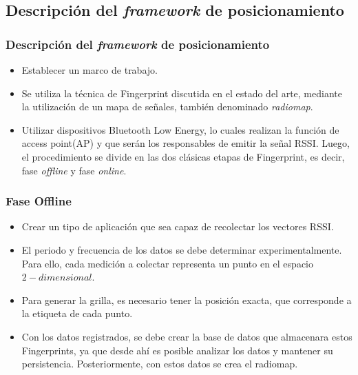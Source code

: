 \documentclass[mathserif]{beamer}
\begin{document}
\subsection{Descripción del \textit{framework} de posicionamiento}
\begin{frame}
\frametitle{Descripción del \textit{framework} de posicionamiento}

\begin{itemize}

\item Establecer un marco de trabajo.

\pause

\item Se utiliza la técnica de Fingerprint discutida en el estado del arte, mediante la utilización de un mapa de señales, también denominado \textit{radiomap}.

\pause

\item Utilizar dispositivos Bluetooth Low Energy, lo cuales realizan la función de access point(AP) y que serán los responsables de emitir la señal RSSI. Luego, el procedimiento se divide en las dos clásicas etapas de Fingerprint, es decir, fase \textit{offline} y fase \textit{online}.
\end{itemize}


\end{frame}



\begin{frame}
\frametitle{Fase Offline}

\begin{itemize}
\item Crear un tipo de aplicación que sea capaz de recolectar los vectores RSSI.

\pause

\item El periodo y frecuencia de los datos se debe determinar experimentalmente. Para ello, cada medición a colectar representa un punto en el espacio $2-dimensional$.

\pause

\item Para generar la grilla, es necesario tener la posición exacta, que corresponde a la etiqueta de cada punto.

\pause

\item Con los datos registrados, se debe crear la base de datos que almacenara estos Fingerprints, ya que desde ahí es posible analizar los datos y mantener su persistencia. Posteriormente, con estos datos se crea el radiomap.
\end{itemize}


\end{frame}
\end{document}
